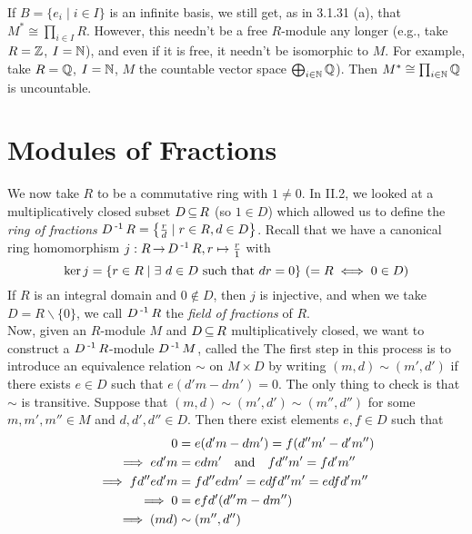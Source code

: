 \documentclass[11pt]{book}
\theoremstyle{definition}   \newtheorem{defn}[counter]{Definition} %
\newcommand{\bs}{\backslash}   \newcommand{\A}{\mathcal{A}}   \newcommand{\sy}{\textnormal{Syl}}   \newcommand{\size}[1]{\left| #1 \right|}
\DeclareMathOperator{\ra}{\rightarrow}   \DeclareMathOperator{\Poly}{\mathbf{P}}   \DeclareMathOperator{\spn}{\textnormal{span}}   \DeclareMathOperator{\aut}{\textnormal{Aut}}
\newcommand{\vs}{\vspace{8pt}}
\numberwithin{counter}{chapter}
\begin{document}
\vs

\begin{remark}
If $B = \{e_i \mid i \in I \}$ is an infinite basis, we still get, as in 3.1.31 (a), that $M^* \cong \prod_{i \in I} R$. However, this needn't be a free $R$-module any longer (e.g., take $R = \operatorname{\mathbb{Z}}$, $I = \operatorname{\mathbb{N}}$), and even if it is free, it needn't be isomorphic to $M$. For example, take $R = \operatorname{\mathbb{Q}}$, $I = \operatorname{\mathbb{N}}$, $M$ the countable vector space $\bigoplus_{i \in \operatorname{\mathbb{N}}} \operatorname{\mathbb{Q}}$). Then $M^* \cong \prod_{i \in \operatorname{\mathbb{N}}} \operatorname{\mathbb{Q}}$ is uncountable.
\end{remark}

\vs





\chapter{\null \quad Modules of Fractions}

We now take $R$ to be a commutative ring with $1 \ne 0$. In II.2, we looked at a multiplicatively closed subset $D \operatorname{\subseteq} R$ (so $1 \in D$) which allowed us to define the \emph{ring of fractions} $D\operatorname{^{-1}} R = \left\{\frac{r}{d} \mid r \in R, d \in D\right\}$. Recall that we have a canonical ring homomorphism $j : R \ra D\inv R, r \mapsto \frac{r}{1}$ with
	\[\ker j = \{r \in R \mid \exists \ d \in D \textnormal{ such that } dr = 0\} \ (= R \iff 0 \in D) \]
If $R$ is an integral domain and $0 \notin D$, then $j$ is injective, and when we take $D = R \bs \{0\}$, we call $D\operatorname{^{-1}} R$ the \emph{field of fractions} of $R$. \\

Now, given an $R$-module $M$ and $D \operatorname{\subseteq} R$ multiplicatively closed, we want to construct a $D\operatorname{^{-1}} R$-module $D\operatorname{^{-1}} M$, called the  The first step in this process is to introduce an equivalence relation $\sim$ on $M \times D$ by writing $(m,d) \sim (m',d')$ if there exists $e \in D$ such that $e(d'm - dm') = 0$. The only thing to check is that $\sim$ is transitive. Suppose that $(m,d) \sim (m',d') \sim (m'',d'')$ for some $m,m',m'' \in M$ and $d,d',d'' \in D$. Then there exist elements $e,f \in D$ such that
\begin{align*}
0 &= e(d'm - dm') = f(d''m' - d'm'') \\
\implies ed'm &= edm' \quad \textnormal{and} \quad fd''m' = fd'm'' \\
\implies fd''ed'm &= fd''edm' = edfd''m' = edfd'm'' \\
\implies 0 &= efd'(d''m-dm'') \\
\implies (md) &\sim (m'',d'')
\end{align*}
\end{document}
